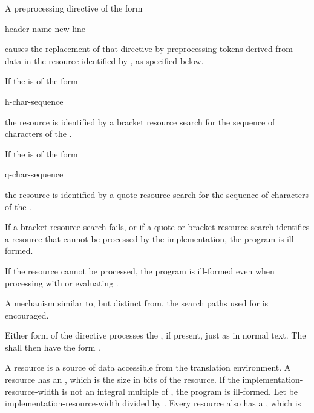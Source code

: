 \pnum
A preprocessing directive of the form
\begin{ncsimplebnf}
 header-name  new-line
\end{ncsimplebnf}
causes the replacement of that directive
by preprocessing tokens derived from data
in the resource identified by ,
as specified below.

\pnum
If the  is of the form
\begin{ncsimplebnf}
\terminal{<} h-char-sequence \terminal{>}
\end{ncsimplebnf}
the resource is identified by a bracket resource search
for the sequence of characters of the .

\pnum
If the  is of the form
\begin{ncsimplebnf}
 q-char-sequence 
\end{ncsimplebnf}
the resource is identified by a quote resource search
for the sequence of characters of the .

\pnum
If a bracket resource search fails,
or if a quote or bracket resource search identifies a resource
that cannot be processed by the implementation, the program is ill-formed.
\begin{note}
If the resource cannot be processed, the program is ill-formed
even when processing  with 
or evaluating .
\end{note}

\pnum
\recommended A mechanism similar to, but distinct from, the
search paths used for 
is encouraged.

\pnum
Either form of the  directive processes the
, if present, just as in normal text.
The  shall then have the form
.

\pnum
A resource is a source of data accessible from the translation environment.
A resource has an , which is the
size in bits of the resource.
If the implementation-resource-width is not an integral multiple of
, the program is ill-formed.
Let  be
implementation-resource-width divided by .
Every resource also has a , which is

